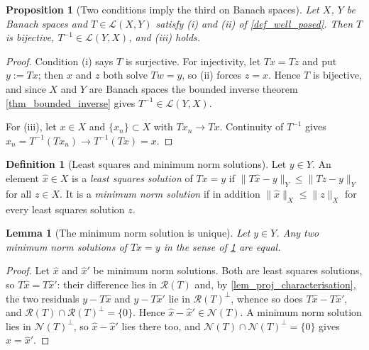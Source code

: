 \documentclass[a4paper]{report}
\theoremstyle{plain}
\newtheorem{lemma}[theorem]{Lemma}
\newtheorem{proposition}[theorem]{Proposition}
\theoremstyle{definition}
\newtheorem{definition}[theorem]{Definition}
\theoremstyle{remark}
\newcommand{\Ll}{\mathcal{L}}
\newcommand{\Ran}{\mathcal{R}}
\newcommand{\Ker}{\mathcal{N}}
\begin{document}
\begin{proposition}[Two conditions imply the third on Banach spaces]
  \label{prop_well_posed_banach}
  Let $X$, $Y$ be Banach spaces and $T \in \Ll(X,Y)$ satisfy (i) and (ii) of
  \cref{def_well_posed}.  Then $T$ is bijective, $T^{-1} \in \Ll(Y,X)$, and (iii) holds.
\end{proposition}

\begin{proof}
  Condition (i) says $T$ is surjective.  For injectivity, let $Tx = Tz$ and put
  $y := Tx$; then $x$ and $z$ both solve $Tw = y$, so (ii) forces $z = x$.  Hence $T$ is
  bijective, and since $X$ and $Y$ are Banach spaces the bounded inverse theorem
  \cref{thm_bounded_inverse} gives $T^{-1} \in \Ll(Y,X)$.

  For (iii), let $x \in X$ and $\{x_n\} \subset X$ with $Tx_n \to Tx$.  Continuity of
  $T^{-1}$ gives $x_n = T^{-1}(Tx_n) \to T^{-1}(Tx) = x$.
\end{proof}


\begin{definition}[Least squares and minimum norm solutions]
  \label{def_lsq_minnorm}
  Let $y \in Y$.  An element $\hat{x} \in X$ is a \emph{least squares solution} of
  $Tx = y$ if $\|T\hat{x} - y\|_Y \le \|Tz - y\|_Y$ for all $z \in X$.  It is a
  \emph{minimum norm solution} if in addition $\|\hat{x}\|_X \le \|z\|_X$ for every least
  squares solution $z$.
\end{definition}


\begin{lemma}[The minimum norm solution is unique]
  \label{lem_minnorm_unique}
  Let $y \in Y$.  Any two minimum norm solutions of $Tx = y$ in the sense of
  \cref{def_lsq_minnorm} are equal.
\end{lemma}

\begin{proof}
  Let $\hat{x}$ and $\hat{x}'$ be minimum norm solutions.  Both are least squares
  solutions, so $T\hat{x} = T\hat{x}'$: their difference lies in $\Ran(T)$ and, by
  \cref{lem_proj_characterisation}, the two residuals $y - T\hat{x}$ and $y - T\hat{x}'$
  lie in $\Ran(T)^{\perp}$, whence so does $T\hat{x} - T\hat{x}'$, and
  $\Ran(T) \cap \Ran(T)^{\perp} = \{0\}$.  Hence $\hat{x} - \hat{x}' \in \Ker(T)$.  A
  minimum norm solution lies in $\Ker(T)^{\perp}$, so $\hat{x} - \hat{x}'$ lies there too,
  and $\Ker(T) \cap \Ker(T)^{\perp} = \{0\}$ gives $\hat{x} = \hat{x}'$.
\end{proof}
\end{document}
